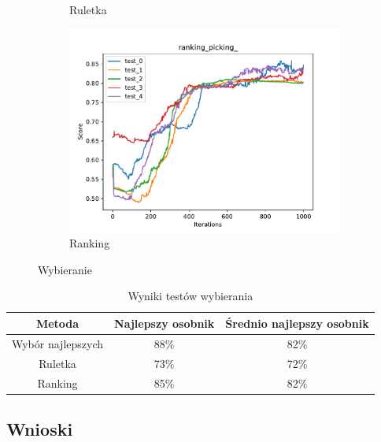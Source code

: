 \begin{figure}[h!]
\begin{subfigure}[b]{0.49\linewidth}
        \caption{Ruletka}
    \end{subfigure}
    \begin{subfigure}[b]{0.49\linewidth}
        \includegraphics[width=\linewidth]{img/ranking_picking_.pdf}
        \caption{Ranking}
    \end{subfigure}
    \caption{Wybieranie}
    \label{fig:picking}
\end{figure}

\begin{table}[H]
    \centering
    \begin{tabular}{|c|c|c|}
    \hline
    Metoda       & Najlepszy osobnik & Średnio najlepszy osobnik \\ \hline
    Wybór najlepszych  & 88\%              & 82\%                      \\ \hline
    Ruletka      & 73\%              & 72\%                      \\ \hline
    Ranking      & 85\%              & 82\%                      \\ \hline
    \end{tabular}
    \caption{Wyniki testów wybierania}
    \label{tab:picking}
\end{table}

\subsection{Wnioski}